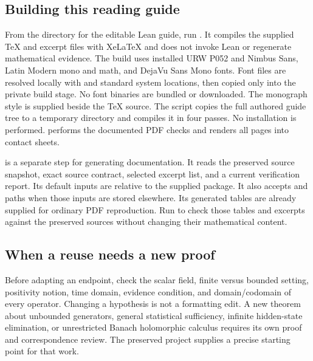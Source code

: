 \subsection{Building this reading guide}
From the directory for the editable Lean guide, run . It compiles the supplied TeX and excerpt files with XeLaTeX and does not invoke Lean or regenerate mathematical evidence. The build uses installed URW P052 and Nimbus Sans, Latin Modern mono and math, and DejaVu Sans Mono fonts. Font files are resolved locally with  and standard system locations, then copied only into the private build stage. No font binaries are bundled or downloaded. The monograph style is supplied beside the TeX source. The script copies the full authored guide tree to a temporary directory and compiles it in four passes. No installation is performed.  performs the documented PDF checks and renders all pages into contact sheets.

 is a separate step for generating documentation. It reads the preserved source snapshot, exact source contract, selected excerpt list, and a current verification report. Its default inputs are relative to the supplied package. It also accepts  and  paths when those inputs are stored elsewhere. Its generated tables are already supplied for ordinary PDF reproduction. Run  to check those tables and excerpts against the preserved sources without changing their mathematical content.

\subsection{When a reuse needs a new proof}
Before adapting an endpoint, check the scalar field, finite versus bounded setting, positivity notion, time domain, evidence condition, and domain/codomain of every operator. Changing a hypothesis is not a formatting edit. A new theorem about unbounded generators, general statistical sufficiency, infinite hidden-state elimination, or unrestricted Banach holomorphic calculus requires its own proof and correspondence review. The preserved project supplies a precise starting point for that work.
